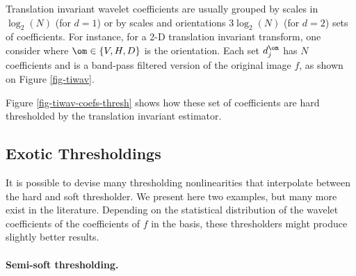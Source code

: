 Translation invariant wavelet coefficients are usually grouped by scales in $\log_2(N)$ (for $d=1$) or by scales and orientations $3 \log_2(N)$ (for $d=2$) sets of coefficients. For instance, for a 2-D translation invariant transform, one consider
where $\om \in \{V,H,D\}$ is the orientation. Each set $d_j^\om$ has $N$ coefficients and is a band-pass filtered version of the original image $f$, as shown on Figure \ref{fig-tiwav}.



Figure \ref{fig-tiwav-coefs-thresh} shows how these set of coefficients are hard thresholded by the translation invariant estimator. 




\subsection{Exotic Thresholdings}

It is possible to devise many thresholding nonlinearities that interpolate between the hard and soft thresholder. We present here two examples, but many more exist in the literature. Depending on the statistical distribution of the wavelet coefficients of the coefficients of $f$ in the basis, these thresholders might produce slightly better results.

\paragraph{Semi-soft thresholding.}

